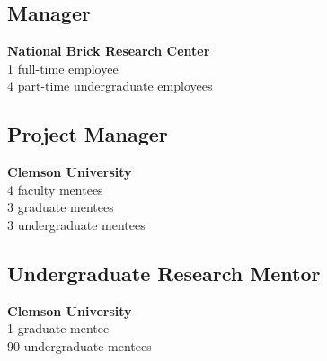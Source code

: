 \begin{flushleft}
    \subsection{Manager}
    \textbf{National Brick Research Center}\\
    1 full-time employee\\
    4 part-time undergraduate employees\\

    \subsection{Project Manager}
    \textbf{Clemson University}\\
    4 faculty mentees\\
    3 graduate mentees\\
    3 undergraduate mentees\\

    \subsection{Undergraduate Research Mentor}
    \textbf{Clemson University}\\
    1 graduate mentee\\
    90 undergraduate mentees\\
\end{flushleft}


